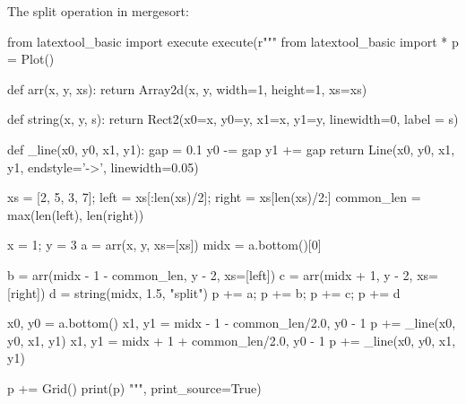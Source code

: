The split operation in mergesort:
\begin{python}
from latextool_basic import execute
execute(r"""
from latextool_basic import *
p = Plot()

def arr(x, y, xs):
    return Array2d(x, y, width=1, height=1, xs=xs)

def string(x, y, s):
    return Rect2(x0=x, y0=y, x1=x, y1=y, linewidth=0, label = s)

def _line(x0, y0, x1, y1):
    gap = 0.1
    y0 -= gap
    y1 += gap
    return Line(x0, y0, x1, y1, endstyle='->', linewidth=0.05)

xs = [2, 5, 3, 7]; left = xs[:len(xs)/2]; right = xs[len(xs)/2:]
common_len = max(len(left), len(right))

x = 1; y = 3
a = arr(x, y, xs=[xs])
midx = a.bottom()[0]

b = arr(midx - 1 - common_len, y - 2, xs=[left])
c = arr(midx + 1, y - 2, xs=[right])
d = string(midx, 1.5, "split")
p += a; p += b; p += c; p += d

x0, y0 = a.bottom()
x1, y1 = midx - 1 - common_len/2.0, y0 - 1
p += _line(x0, y0, x1, y1)
x1, y1 = midx + 1 + common_len/2.0, y0 - 1
p += _line(x0, y0, x1, y1)

p += Grid()
print(p)
""", print_source=True)
\end{python}

